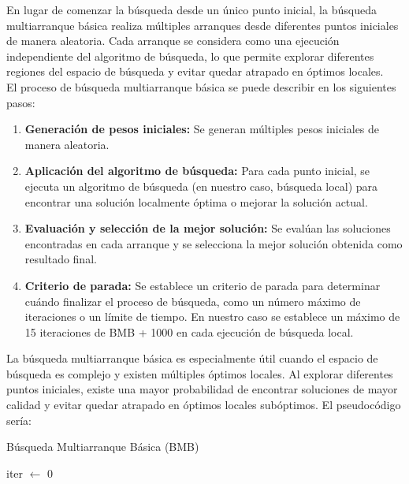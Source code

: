 En lugar de comenzar la búsqueda desde un único punto inicial, la búsqueda multiarranque básica realiza múltiples arranques desde diferentes puntos iniciales de manera aleatoria. Cada arranque se considera como una ejecución independiente del algoritmo de búsqueda, lo que permite explorar diferentes regiones del espacio de búsqueda y evitar quedar atrapado en óptimos locales.\\

El proceso de búsqueda multiarranque básica se puede describir en los siguientes pasos:

\begin{enumerate}
\item \textbf{Generación de pesos iniciales:} Se generan múltiples pesos iniciales de manera aleatoria.

\item \textbf{Aplicación del algoritmo de búsqueda:} Para cada punto inicial, se ejecuta un algoritmo de búsqueda (en nuestro caso, búsqueda local) para encontrar una solución localmente óptima o mejorar la solución actual.

\item \textbf{Evaluación y selección de la mejor solución:} Se evalúan las soluciones encontradas en cada arranque y se selecciona la mejor solución obtenida como resultado final.

\item \textbf{Criterio de parada: } Se establece un criterio de parada para determinar cuándo finalizar el proceso de búsqueda, como un número máximo de iteraciones o un límite de tiempo. En nuestro caso se establece un máximo de 15 iteraciones de BMB + 1000 en cada ejecución de búsqueda local. 
\end{enumerate}

La búsqueda multiarranque básica es especialmente útil cuando el espacio de búsqueda es complejo y existen múltiples óptimos locales. Al explorar diferentes puntos iniciales, existe una mayor probabilidad de encontrar soluciones de mayor calidad y evitar quedar atrapado en óptimos locales subóptimos. El pseudocódigo sería:

\begin{algorithm}[H]
	\caption{Búsqueda Multiarranque Básica (BMB)}
	
	
	iter $\leftarrow$ 0	\;
	
	\;
\end{algorithm}

